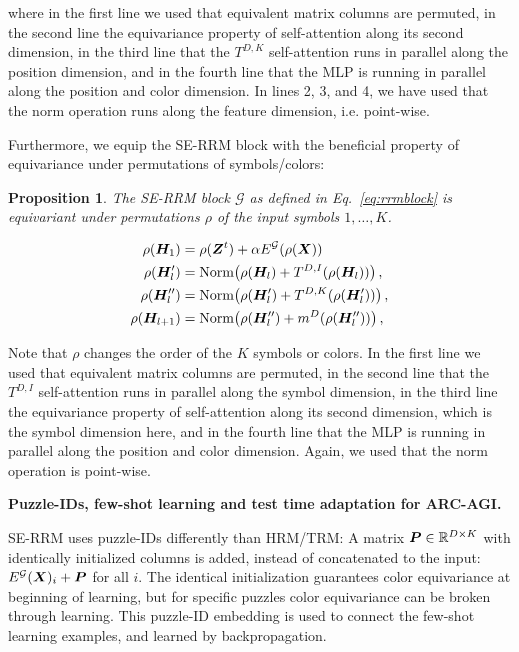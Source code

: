 \documentclass{article}
\theoremstyle{plain}
\newtheorem{proposition}[theorem]{Proposition}
\theoremstyle{definition}
\theoremstyle{remark}
\renewcommand{\paragraph}[1]{\textbf{#1}\;}
\begin{document}
where in the first line we used that equivalent
matrix columns are permuted,
in the second line the equivariance property of self-attention along its second dimension,
in the third line that the $T^{D,K}$ self-attention runs
in parallel along the position dimension, 
and in the fourth line that the MLP is running in parallel
along the position and color dimension. In lines
2, 3, and 4, we have used that the norm operation runs
along the feature dimension, i.e. point-wise. 

Furthermore, we equip the SE-RRM block with the 
beneficial property of equivariance under permutations
of symbols/colors:
\begin{proposition}
    The SE-RRM block $\mathcal{G}$
    as defined in 
    Eq.~\eqref{eq:rrmblock} is equivariant under
    permutations $\rho$ of the input symbols $1,\ldots,K$. 
\end{proposition}

\begin{align} 
    \rho(\bm{H}_1) &= \rho(\bm{Z}^t) + \alpha E^{\mathcal G}(\rho(\bm{X}))  \\
    \rho(\bm{H}'_{l}) &= \text{Norm}\!\left( \rho(\bm{H}_{l}) + T^{D,I}(\rho(\bm{H}_{l})) \right),  \\
    \rho(\bm{H}''_{l}) &= \text{Norm}\!\left(\rho(\bm{H}'_{l}) + T^{D,K}(\rho(\bm{H}'_{l}))\right), \\
    \rho(\bm{H}_{l+1}) &= \text{Norm}\!\left(\rho(\bm{H}''_{l}) + m^{D}(\rho(\bm{H}''_{l}))\right) ,
\end{align}


Note that $\rho$ changes the order of the $K$ symbols
or colors. 
In the first line we used that equivalent
matrix columns are permuted,
in the second line that the $T^{D,I}$ self-attention runs
in parallel along the symbol dimension,
in the third line the equivariance property of self-attention along its second dimension, which is the symbol dimension here,
and in the fourth line that the MLP is running in parallel
along the position and color dimension. Again, we used
that the norm operation is point-wise. 


\paragraph{Puzzle-IDs, few-shot learning
and test time adaptation for ARC-AGI.}

SE-RRM uses puzzle-IDs differently 
than HRM/TRM: A matrix
$\bm{P} \in \mathbb{R}^{D \times K}$
with identically initialized columns
is added, instead of concatenated
to the input: $E^{\mathcal G}(\bm{X})_{i} + \bm{P}$
for all $i$. The identical initialization guarantees
color equivariance at beginning of learning, 
but for specific puzzles color equivariance 
can be broken through learning. 
This puzzle-ID embedding is used to 
connect the few-shot learning examples, 
and learned by backpropagation. 
\end{document}
